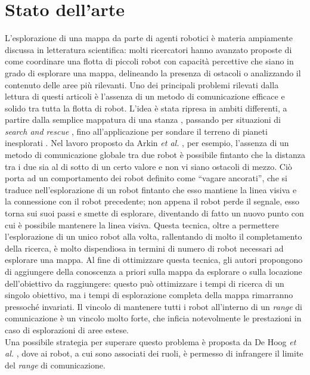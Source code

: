 \chapter{Stato dell'arte}
\label{chap:stateofart}
L'esplorazione di una mappa da parte di agenti robotici è materia ampiamente discussa in letteratura scientifica: molti ricercatori hanno avanzato proposte di come coordinare una flotta di piccoli robot con capacità percettive che siano in grado di esplorare una mappa, delineando la presenza di ostacoli o analizzando il contenuto delle aree più rilevanti. Uno dei principali problemi rilevati dalla lettura di questi articoli è l'assenza di un metodo di comunicazione efficace e solido tra tutta la flotta di robot. 
L'idea è stata ripresa in ambiti differenti, a partire dalla semplice mappatura di una stanza \cite{de2009role}, passando per situazioni di \textit{search and rescue} \cite{kitano1999robocup}, fino all'applicazione per sondare il terreno di pianeti inesplorati \cite{moorehead2001multiple}.
Nel lavoro proposto da Arkin \textit{et al.} \cite{arkin2002line}, per esempio, l'assenza di un metodo di comunicazione globale tra due robot è possibile fintanto che la distanza tra i due sia al di sotto di un certo valore e non vi siano ostacoli di mezzo. 
Ciò porta ad un comportamento dei robot definito come “vagare ancorati”, che si traduce nell'esplorazione di un robot fintanto che esso mantiene la linea visiva e la connessione con il robot precedente; non appena il robot perde il segnale, esso torna sui suoi passi e smette di esplorare, diventando di fatto un nuovo punto con cui è possibile mantenere la linea visiva. 
Questa tecnica, oltre a permettere l'esplorazione di un unico robot alla volta, rallentando di molto il completamento della ricerca, è molto dispendiosa in termini di numero di robot necessari ad esplorare una mappa. 
Al fine di ottimizzare questa tecnica, gli autori propongono di aggiungere della conoscenza a priori sulla mappa da esplorare o sulla locazione dell'obiettivo da raggiungere: questo può ottimizzare i tempi di ricerca di un singolo obiettivo, ma i tempi di esplorazione completa della mappa rimarranno pressoché invariati. 
Il vincolo di mantenere tutti i robot all'interno di un \textit{range} di comunicazione è un vincolo molto forte, che inficia notevolmente le prestazioni in caso di esplorazioni di aree estese.\\
Una possibile strategia per superare questo problema è proposta da De Hoog \textit{et al.} \cite{de2009role}, dove ai robot, a cui sono associati dei ruoli, è permesso di infrangere il limite del \textit{range} di comunicazione. 
